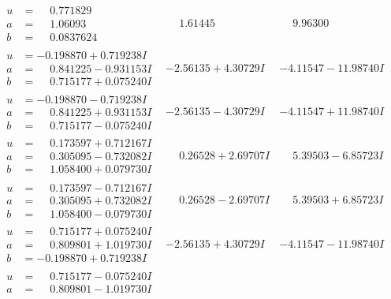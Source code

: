 \documentclass[1p]{elsarticle_modified}
\theoremstyle{definition}
\begin{document}
$$\begin{array}{c|c|c}
\begin{aligned}
u &= \phantom{-}0.771829\phantom{ +0.000000I} \\
a &= \phantom{-}1.06093\phantom{ +0.000000I} \\
b &= \phantom{-}0.0837624\phantom{ +0.000000I}\end{aligned}
 & \phantom{-}1.61445\phantom{ +0.000000I} & \phantom{-}9.96300\phantom{ +0.000000I} \\ \hline\begin{aligned}
u &= -0.198870 + 0.719238 I \\
a &= \phantom{-}0.841225 - 0.931153 I \\
b &= \phantom{-}0.715177 + 0.075240 I\end{aligned}
 & -2.56135 + 4.30729 I & -4.11547 - 11.98740 I \\ \hline\begin{aligned}
u &= -0.198870 - 0.719238 I \\
a &= \phantom{-}0.841225 + 0.931153 I \\
b &= \phantom{-}0.715177 - 0.075240 I\end{aligned}
 & -2.56135 - 4.30729 I & -4.11547 + 11.98740 I \\ \hline\begin{aligned}
u &= \phantom{-}0.173597 + 0.712167 I \\
a &= \phantom{-}0.305095 - 0.732082 I \\
b &= \phantom{-}1.058400 + 0.079730 I\end{aligned}
 & \phantom{-}0.26528 + 2.69707 I & \phantom{-}5.39503 - 6.85723 I \\ \hline\begin{aligned}
u &= \phantom{-}0.173597 - 0.712167 I \\
a &= \phantom{-}0.305095 + 0.732082 I \\
b &= \phantom{-}1.058400 - 0.079730 I\end{aligned}
 & \phantom{-}0.26528 - 2.69707 I & \phantom{-}5.39503 + 6.85723 I \\ \hline\begin{aligned}
u &= \phantom{-}0.715177 + 0.075240 I \\
a &= \phantom{-}0.809801 + 1.019730 I \\
b &= -0.198870 + 0.719238 I\end{aligned}
 & -2.56135 + 4.30729 I & -4.11547 - 11.98740 I \\ \hline\begin{aligned}
u &= \phantom{-}0.715177 - 0.075240 I \\
a &= \phantom{-}0.809801 - 1.019730 I \\

\end{aligned}
\end{array}$$
\end{document}
